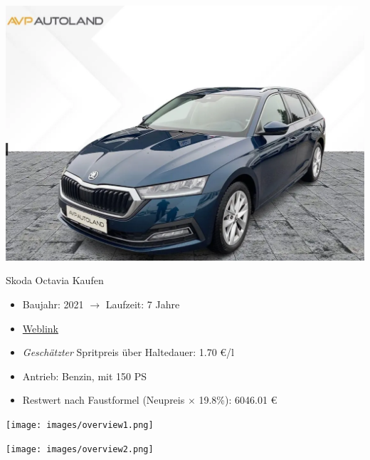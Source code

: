\documentclass[landscape, DIV=99, 14pt]{scrartcl}
\begin{document}
\pagebreak
\null
\vspace{2cm}
\begin{center}
\includegraphics[width=0.9\columnwidth]{cars/skoda-octavia-avp.png}

Skoda Octavia Kaufen
\end{center}

\begin{itemize}
    \item Baujahr: 2021 $\rightarrow$ Laufzeit: 7 Jahre
    \item \href{https://fahrzeugangebote.skoda-auto.de/fahrzeug/skoda-octavia-combi-1-5-tsi-e-tec-dsg-style-navi/details/855329/\#car_details}{Weblink}
    \item \emph{Gesch\"atzter} Spritpreis \"uber Haltedauer: 1.70 \euro{}/l
    \item Antrieb: Benzin, mit 150 PS
    \item Restwert nach Faustformel (Neupreis $\times$ 19.8\%): 6046.01 \euro{}
\end{itemize}

\pagebreak



\pagebreak

\onecolumn
\null
\vfill 
\texttt{[image: images/overview1.png]}

\null
\vspace{0.8cm}
\texttt{[image: images/overview2.png]}
\vfill 
\end{document}
